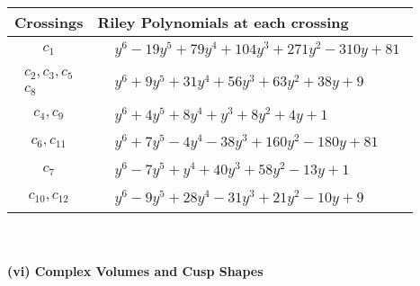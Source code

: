 \documentclass[1p]{elsarticle_modified}
\theoremstyle{definition}
\begin{document}
\begin{tabular}{m{50pt}|m{274pt}}
Crossings & \hspace{64pt}Riley Polynomials at each crossing \\
\hline $$\begin{aligned}c_{1}\end{aligned}$$&$\begin{aligned}
&y^6-19 y^5+79 y^4+104 y^3+271 y^2-310 y+81
\end{aligned}$\\
\hline $$\begin{aligned}c_{2},c_{3},c_{5}\\c_{8}\end{aligned}$$&$\begin{aligned}
&y^6+9 y^5+31 y^4+56 y^3+63 y^2+38 y+9
\end{aligned}$\\
\hline $$\begin{aligned}c_{4},c_{9}\end{aligned}$$&$\begin{aligned}
&y^6+4 y^5+8 y^4+y^3+8 y^2+4 y+1
\end{aligned}$\\
\hline $$\begin{aligned}c_{6},c_{11}\end{aligned}$$&$\begin{aligned}
&y^6+7 y^5-4 y^4-38 y^3+160 y^2-180 y+81
\end{aligned}$\\
\hline $$\begin{aligned}c_{7}\end{aligned}$$&$\begin{aligned}
&y^6-7 y^5+y^4+40 y^3+58 y^2-13 y+1
\end{aligned}$\\
\hline $$\begin{aligned}c_{10},c_{12}\end{aligned}$$&$\begin{aligned}
&y^6-9 y^5+28 y^4-31 y^3+21 y^2-10 y+9
\end{aligned}$\\
\hline
\end{tabular}\\~\\
\newpage\flushleft \textbf{(vi) Complex Volumes and Cusp Shapes}
\end{document}
